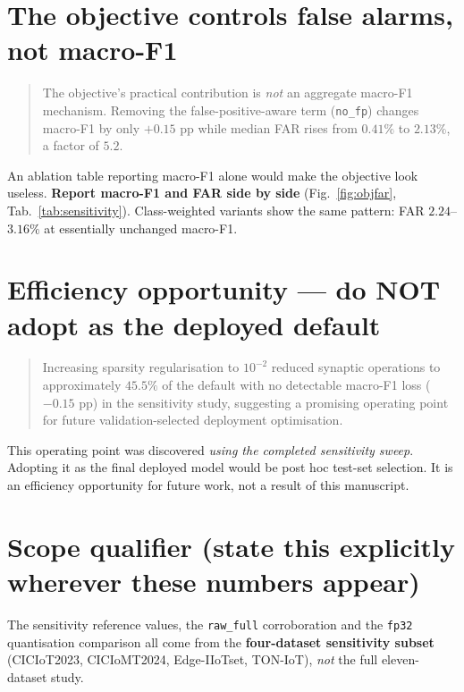 \section*{The objective controls false alarms, not macro-F1}

\begin{quote}
The objective's practical contribution is \emph{not} an aggregate macro-F1 mechanism.
Removing the false-positive-aware term (\texttt{no\_fp}) changes macro-F1 by only
$+0.15$ pp while median FAR rises from $0.41\%$ to $2.13\%$, a factor of $5.2$.
\end{quote}

\noindent An ablation table reporting macro-F1 alone would make the objective look
useless. \textbf{Report macro-F1 and FAR side by side} (Fig.~\ref{fig:objfar},
Tab.~\ref{tab:sensitivity}). Class-weighted variants show the same pattern: FAR
$2.24$--$3.16\%$ at essentially unchanged macro-F1.

\section*{Efficiency opportunity --- do NOT adopt as the deployed default}

\begin{quote}
Increasing sparsity regularisation to $10^{-2}$ reduced synaptic operations to
approximately $45.5\%$ of the default with no detectable macro-F1 loss
($-0.15$ pp) in the sensitivity study, suggesting a promising operating point for
future validation-selected deployment optimisation.
\end{quote}

\noindent This operating point was discovered \emph{using the completed sensitivity
sweep}. Adopting it as the final deployed model would be post hoc test-set selection.
It is an efficiency opportunity for future work, not a result of this manuscript.

\section*{Scope qualifier (state this explicitly wherever these numbers appear)}

The sensitivity reference values, the \texttt{raw\_full} corroboration and the
\texttt{fp32} quantisation comparison all come from the \textbf{four-dataset
sensitivity subset} (CICIoT2023, CICIoMT2024, Edge-IIoTset, TON-IoT), \emph{not} the
full eleven-dataset study.

